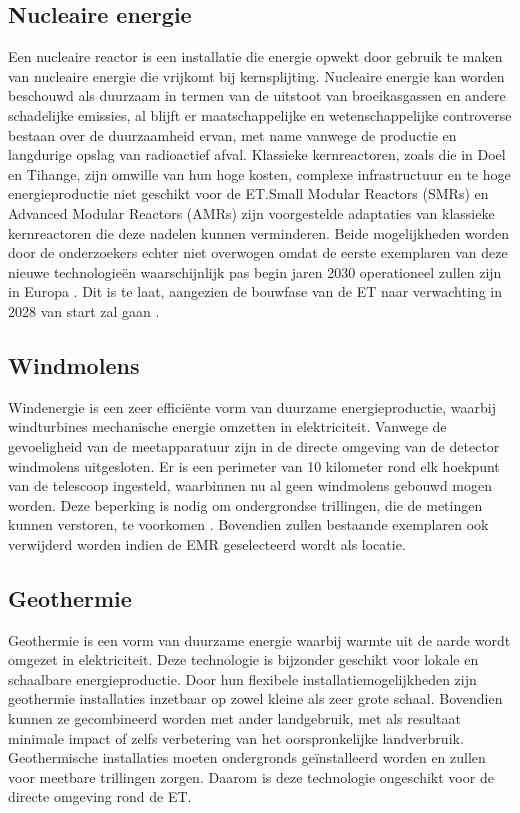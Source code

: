 \subsection{Nucleaire energie}\label{sec:energiebronnen_Nucleair}
Een nucleaire reactor is een installatie die energie opwekt door gebruik te maken van nucleaire energie die vrijkomt bij kernsplijting. Nucleaire energie kan worden beschouwd als duurzaam in termen van de uitstoot van broeikasgassen en andere schadelijke emissies, al blijft er maatschappelijke en wetenschappelijke controverse bestaan over de duurzaamheid ervan, met name vanwege de productie en langdurige opslag van radioactief afval. Klassieke kernreactoren, zoals die in Doel en Tihange, zijn omwille van hun hoge kosten, complexe infrastructuur en te hoge energieproductie niet geschikt voor de ET.\@ Small Modular Reactors (SMRs) en Advanced Modular Reactors (AMRs) zijn voorgestelde adaptaties van klassieke kernreactoren die deze nadelen kunnen verminderen. Beide mogelijkheden worden door de onderzoekers echter niet overwogen omdat de eerste exemplaren van deze nieuwe technologieën waarschijnlijk pas begin jaren 2030 operationeel zullen zijn in Europa \autocite{EuropeanCommission2026}. Dit is te laat, aangezien de bouwfase van de ET naar verwachting in 2028 van start zal gaan \autocite{Telescope2026}.

\subsection{Windmolens}\label{sec:energiebronnen_Windmolens}
Windenergie is een zeer efficiënte vorm van duurzame energieproductie, waarbij windturbines mechanische energie omzetten in elektriciteit. Vanwege de gevoeligheid van de meetapparatuur zijn in de directe omgeving van de detector windmolens uitgesloten. Er is een perimeter van 10 kilometer rond elk hoekpunt van de telescoop ingesteld, waarbinnen nu al geen windmolens gebouwd mogen worden. Deze beperking is nodig om ondergrondse trillingen, die de metingen kunnen verstoren, te voorkomen \autocite{Telescope2026}. Bovendien zullen bestaande exemplaren ook verwijderd worden indien de EMR geselecteerd wordt als locatie.

\subsection{Geothermie}\label{sec:energiebronnen_Geothermie}
Geothermie is een vorm van duurzame energie waarbij warmte uit de aarde wordt omgezet in elektriciteit. Deze technologie is bijzonder geschikt voor lokale en schaalbare energieproductie. Door hun flexibele installatiemogelijkheden zijn geothermie installaties inzetbaar op zowel kleine als zeer grote schaal. Bovendien kunnen ze gecombineerd worden met ander landgebruik, met als resultaat minimale impact of zelfs verbetering van het oorspronkelijke landverbruik. Geothermische installaties moeten ondergronds geïnstalleerd worden en zullen voor meetbare trillingen zorgen. Daarom is deze technologie ongeschikt voor de directe omgeving rond de ET.\@

